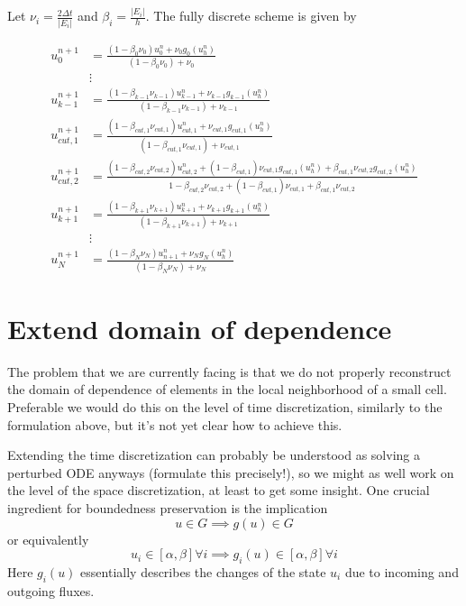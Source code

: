 \documentclass[]{article}
\begin{document}
Let $\nu_i = \frac{2 \Delta t}{|E_i|}$ and $\beta_i = \frac{|E_i|}{h}$. The fully discrete scheme is given by

\begin{align*}
	u_0^{n+1}& = \frac{(1 - \beta_0 \nu_0) u_0^n + \nu_0 g_0(u_h^n)}{(1 - \beta_0 \nu_0) + \nu_0}\\
	& \vdots \\
	u_{k-1}^{n+1} & = \frac{(1 - \beta_{k-1} \nu_{k-1}) u_{k-1}^n + \nu_{k-1} g_{k-1}(u_h^n)}{(1 - \beta_{k-1} \nu_{k-1}) + \nu_{k-1}}\\
	u_{cut, 1}^{n+1} & = \frac{(1 - \beta_{cut, 1} \nu_{cut, 1}) u_{cut, 1}^n + \nu_{cut, 1} g_{cut, 1}(u_h^n)}{(1 - \beta_{cut, 1} \nu_{cut, 1}) + \nu_{cut, 1}}\\
	u_{cut, 2}^{n+1}  & = \frac{(1 - \beta_{cut, 2} \nu_{cut, 2}) u_{cut, 2}^n + (1 - \beta_{cut, 1}) \nu_{cut, 1} g_{cut, 1} (u_h^n) + \beta_{cut, 1} \nu_{cut, 2} g_{cut, 2}(u_h^n)}{1 - \beta_{cut, 2} \nu_{cut, 2} + (1 - \beta_{cut, 1}) \nu_{cut, 1} + \beta_{cut, 1} \nu_{cut, 2}}\\
	u_{k+1}^{n+1}  & = \frac{(1 - \beta_{k+1} \nu_{k+1}) u_{k+1}^n + \nu_{k+1} g_{k+1}(u_h^n)}{(1 - \beta_{k+1} \nu_{k+1}) + \nu_{k+1}}\\
	& \vdots\\
	u_N^{n+1} & = \frac{(1 - \beta_N \nu_N) u_{n+1}^n + \nu_N g_N(u_h^n)}{(1 - \beta_N \nu_N) + \nu_N}
\end{align*}

\section*{Extend domain of dependence}

The problem that we are currently facing is that we do not properly reconstruct the domain of dependence of elements in the local neighborhood of a small cell. Preferable we would do this on the level of time discretization, similarly to the formulation above, but it's not yet clear how to achieve this.

Extending the time discretization can probably be understood as solving a perturbed ODE anyways (formulate this precisely!), so we might as well work on the level of the space discretization, at least to get some insight. One crucial ingredient for boundedness preservation is the implication
\begin{displaymath}
	u \in G \implies g(u) \in G
\end{displaymath}
or equivalently
\begin{displaymath}
	u _i\in [\alpha, \beta] \forall i \implies g_i(u) \in [\alpha, \beta] \forall i
\end{displaymath}
Here $g_i(u)$ essentially describes the changes of the state $u_i$ due to incoming and outgoing fluxes.
\end{document}
